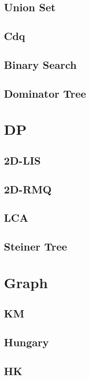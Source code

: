 \documentclass[twocolumn]{article}
\begin{document}
\subsection{Union Set}

\subsection{Cdq}

\subsection{Binary Search}

\subsection{Dominator Tree}

\section{DP}
\subsection{2D-LIS}

\subsection{2D-RMQ}

\subsection{LCA}

\subsection{Steiner Tree}

\section{Graph}
\subsection{KM}

\subsection{Hungary}

\subsection{HK}

\end{document}
